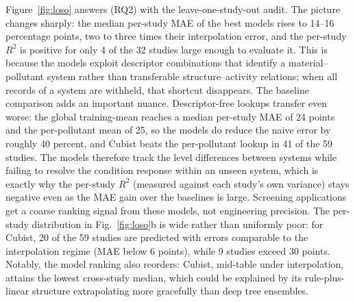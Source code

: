 Figure~\ref{fig:loso} answers (RQ2) with the leave-one-study-out audit.
The picture changes sharply: the median per-study MAE of the best models
rises to 14--16 percentage points, two to three times their
interpolation error, and the per-study $R^2$ is positive for only 4 of
the 32 studies large enough to evaluate it. This is because the models
exploit descriptor combinations that identify a material--pollutant
system rather than transferable structure--activity relations; when all
records of a system are withheld, that shortcut disappears. The
baseline comparison adds an important nuance. Descriptor-free lookups
transfer even worse: the global training-mean reaches a median per-study
MAE of 24 points and the per-pollutant mean of 25, so the models do
reduce the naive error by roughly 40 percent, and Cubist beats the
per-pollutant lookup in 41 of the 59 studies. The models therefore
track the level differences between systems while failing to resolve the
condition response within an unseen system, which is exactly why the
per-study $R^2$ (measured against each study's own variance) stays
negative even as the MAE gain over the baselines is large. Screening
applications get a coarse ranking signal from these models, not
engineering precision. The
per-study distribution in Fig.~\ref{fig:loso}b is wide rather than
uniformly poor: for Cubist, 20 of the 59 studies are predicted with
errors comparable to the interpolation regime (MAE below 6 points),
while 9 studies exceed 30 points. Notably, the model ranking also
reorders: Cubist, mid-table under interpolation, attains the lowest
cross-study median, which could be explained by its rule-plus-linear
structure extrapolating more gracefully than deep tree ensembles.

